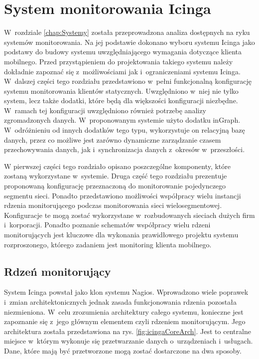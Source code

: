 \chapter{System monitorowania Icinga}
\label{chap:Icinga}

W~rozdziale \ref{chap:Systemy} została przeprowadzona analiza
dostępnych na ryku systemów monitorowania. Na jej podstawie dokonano
wyboru systemu Icinga jako podstawy do budowy systemu uwzględniającego
wymagania dotyczące klienta mobilnego. Przed przystąpieniem do
projektowania takiego systemu należy dokładnie zapoznać się
z~możliwościami jak i~ograniczeniami systemu Icinga. W~dalszej części
tego rozdziału przedstawiono w~pełni funkcjonalną konfigurację systemu
monitorowania klientów statycznych. Uwzględniono w~niej nie tylko
system, lecz także dodatki, które będą dla większości konfiguracji
niezbędne. W~ramach tej konfiguracji uwzględniono również potrzebę
analizy zgromadzonych danych. W~proponowanym systemie użyto dodatku
inGraph. W~odróżnieniu od innych dodatków tego typu, wykorzystuje on
relacyjną bazę danych, przez co możliwe jest zarówno dynamiczne
zarządzanie czasem przechowywania danych, jak i~synchronizacja danych
z~okresów w~przeszłości.

W pierwszej części tego rozdziało opisano poszczególne komponenty,
które zostaną wykorzystane w~systemie. Druga część tego rozdziału
prezentuje proponowaną konfigurację przeznaczoną do monitorowanie
pojedynczego segmentu sieci. Ponadto przedstawiono możliwości
współpracy wielu instancji rdzenia monitorującego podczas
monitorowania sieci wielosegmentowej. Konfiguracje te mogą zostać
wykorzystane w~rozbudowanych sieciach dużych firm
i~korporacji. Ponadto poznanie schematów współpracy wielu rdzeni
monitorujących jest kluczowe dla wykonania prawidłowego projektu
systemu rozproszonego, którego zadaniem jest monitoring klienta
mobilnego.

\section[Rdzeń monitorujący][Rdzeń monitorujący]{Rdzeń monitorujący}

System Icinga powstał jako klon systemu Nagios. Wprowadzono wiele
poprawek i~zmian architektonicznych jednak zasada funkcjonowania
rdzenia pozostała niezmieniona. W~celu zrozumienia architektury całego
systemu, konieczne jest zapoznanie się z~jego głównym elementem czyli
rdzeniem monitorującym. Jego architektura została przedstawiona na
rys. \ref{fig:icingaCoreArch}. Jest to centralne miejsce w~którym
wykonuje się przetwarzanie danych o~urządzeniach i~usługach. Dane,
które mają być przetworzone mogą zostać dostarczone na dwa sposoby.

